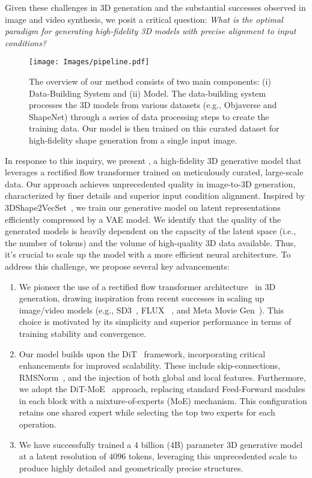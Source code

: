 Given these challenges in 3D generation and the substantial successes observed in image and video synthesis, we posit a critical question: \emph{What is the optimal paradigm for generating high-fidelity 3D models with precise alignment to input conditions?}

\begin{figure}
    \centering
    \texttt{[image: Images/pipeline.pdf]}
    \caption{The overview of our method consists of two main components: (i) Data-Building System and (ii) \method{} Model. The data-building system processes the 3D models from various datasets (e.g., Objaverse and ShapeNet) through a series of data processing steps to create the training data. Our \method{} model is then trained on this curated dataset for high-fidelity shape generation from a single input image.}
    \label{fig:pipeline}
\end{figure}


In response to this inquiry, we present \emph{\method{}}, a high-fidelity 3D generative model that leverages a rectified flow transformer trained on meticulously curated, large-scale data. Our approach achieves unprecedented quality in image-to-3D generation, characterized by finer details and superior input condition alignment.
Inspired by 3DShape2VecSet~\cite{zhang20233dshape2vecset}, we train our generative model on latent representations efficiently compressed by a VAE model.
We identify that the quality of the generated models is heavily dependent on the capacity of the latent space (i.e., the number of tokens) and the volume of high-quality 3D data available.
Thus, it's crucial to scale up the model with a more efficient neural architecture. To address this challenge, we propose several key advancements:
\begin{enumerate}
\item We pioneer the use of a rectified flow transformer architecture~\cite{DBLP:conf/iclr/LiuG023} in 3D generation, drawing inspiration from recent successes in scaling up image/video models (e.g., SD3~\cite{esser2024scaling}, FLUX
~\cite{flux}, and Meta Movie Gen~\cite{metamoviegen}). This choice is motivated by its simplicity and superior performance in terms of training stability and convergence.
\item Our model builds upon the DiT~\cite{peebles2023scalable} framework, incorporating critical enhancements for improved scalability. These include skip-connections, RMSNorm~\cite{zhang2019root}, and the injection of both global and local features. Furthermore, we adopt the DiT-MoE~\cite{fei2024scaling} approach, replacing standard Feed-Forward modules in each block with a mixture-of-experts (MoE) mechanism. This configuration retains one shared expert while selecting the top two experts for each operation.
\item We have successfully trained a 4 billion (4B) parameter 3D generative model at a latent resolution of $4096$ tokens, leveraging this unprecedented scale to produce highly detailed and geometrically precise structures.
\end{enumerate}


